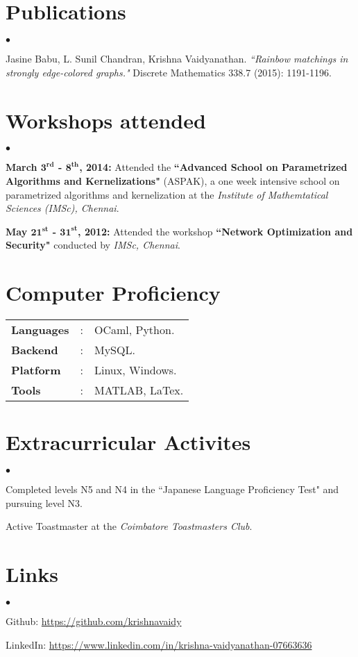 \documentclass[margin,line]{res}
\newenvironment{list2}{
  \begin{list}{$\bullet$}{%
      \setlength{\itemsep}{0in}
      \setlength{\parsep}{0in} \setlength{\parskip}{0in}
      \setlength{\topsep}{0in} \setlength{\partopsep}{0in} 
      \setlength{\leftmargin}{0.2in}}}{\end{list}}
\begin{document}
\begin{resume}
\section{\sc Publications}
\begin{list2}
\item Jasine  Babu,  L.  Sunil  Chandran, Krishna  Vaidyanathan. \textit{``Rainbow matchings in strongly edge-colored graphs."} Discrete Mathematics 338.7 (2015):  1191-1196.
\end{list2}

\section{\sc Workshops attended}
\begin{list2}
\item \textbf{March $\mathbf{3^{rd}}$ - $\mathbf{8^{th}}$, 2014:} Attended the \textbf{``Advanced School on Parametrized Algorithms and Kernelizations"} (ASPAK), a one week intensive school on parametrized algorithms and kernelization at the \textit{Institute of Mathemtatical Sciences (IMSc), Chennai}.

\item  \textbf{May $\mathbf{21^{st}}$ - $\mathbf{31^{st}}$, 2012:} Attended the workshop \textbf{``Network Optimization and Security"} conducted by \textit{IMSc, Chennai}.
\end{list2}

\section{\sc Computer Proficiency}
\begin{tabular}{l l l}

\textbf{Languages}&: & OCaml, Python.\\
\textbf{Backend}&:	& MySQL.\\
\textbf{Platform}&:  & Linux, Windows.\\
\textbf{Tools}&:     &MATLAB, LaTex.\\
\end{tabular}

\section{\sc Extracurricular Activites}
\begin{list2}
\item  Completed levels N5 and N4 in the ``Japanese Language Proficiency Test" and pursuing level N3.
\item Active Toastmaster at the \textit{Coimbatore Toastmasters Club}.
\end{list2}

\section{\sc Links}
\begin{list2}
\item Github: \url{https://github.com/krishnavaidy}
\item LinkedIn: \url{https://www.linkedin.com/in/krishna-vaidyanathan-07663636}
\end{list2}

\end{resume}
\end{document}
